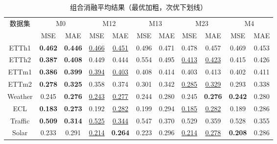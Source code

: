 \begin{table}[htbp]
    \centering
    \caption{组合消融平均结果（最优加粗，次优下划线）}
    \label{tab:combined_module_avg}
    \begin{tabular*}{\textwidth}{@{\extracolsep{\fill}}c*{10}{c}@{}}
        \toprule
        数据集 & \multicolumn{2}{c}{M0} & \multicolumn{2}{c}{M12} & \multicolumn{2}{c}{M13} & \multicolumn{2}{c}{M23} & \multicolumn{2}{c}{M4} \\
        & MSE & MAE & MSE & MAE & MSE & MAE & MSE & MAE & MSE & MAE \\
        \midrule
        ETTh1 & \textbf{0.462} & \textbf{0.446} & \underline{0.466} & \underline{0.451} & 0.496 & 0.471 & 0.478 & 0.457 & 0.469 & 0.453 \\
        ETTh2 & \textbf{0.387} & \textbf{0.408} & 0.449 & 0.444 & 0.554 & 0.495 & \underline{0.413} & \underline{0.423} & 0.415 & 0.426 \\
        ETTm1 & \textbf{0.386} & \textbf{0.399} & \underline{0.394} & \underline{0.403} & 0.408 & 0.414 & 0.403 & 0.413 & 0.402 & 0.411 \\
        ETTm2 & \textbf{0.278} & \textbf{0.325} & 0.358 & 0.374 & 0.301 & 0.342 & \underline{0.285} & \underline{0.329} & 0.293 & 0.338 \\
        Weather & 0.245 & \textbf{0.276} & \underline{0.243} & \underline{0.277} & 0.244 & 0.280 & 0.245 & \textbf{0.276} & \textbf{0.242} & 0.280 \\
        ECL & \textbf{0.183} & \textbf{0.273} & 0.192 & \underline{0.282} & 0.199 & 0.294 & \underline{0.185} & \underline{0.282} & 0.189 & 0.286 \\
        Traffic & \textbf{0.509} & \textbf{0.314} & \underline{0.525} & \underline{0.344} & 0.547 & 0.370 & 0.529 & 0.359 & 0.528 & 0.355 \\
        Solar & 0.233 & 0.291 & \underline{0.214} & \textbf{0.264} & 0.223 & 0.296 & \underline{0.214} & \underline{0.278} & \textbf{0.208} & 0.286 \\
        \bottomrule
    \end{tabular*}
\end{table}
